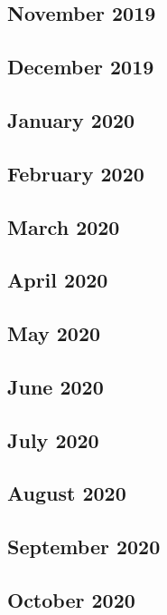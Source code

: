 \documentclass{article}
\begin{document}
	\subsection{November 2019}
	
	\subsection{December 2019}
	
	\subsection{January 2020}
	
	\subsection{February 2020}
	
	\subsection{March 2020}
	
	\subsection{April 2020}	
	
	\subsection{May 2020}
	
	\subsection{June 2020}
	
	\subsection{July 2020}
	
	\subsection{August 2020}
	
	\subsection{September 2020}
	
	\subsection{October 2020}
	
\end{document}
